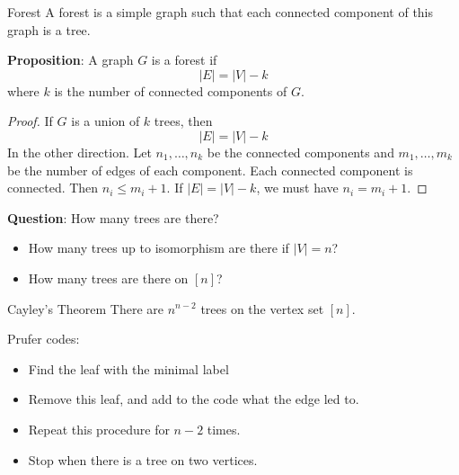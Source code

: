 \documentclass{report}
\begin{document}
\begin{definition}{Forest}
    A forest is a simple graph such that each connected component of this graph is a tree.
\end{definition}

\textbf{Proposition}: A graph $G$ is a forest if 
    \begin{equation*}
        \lvert E \rvert = \lvert V \rvert - k
    \end{equation*}
where $k$ is the number of connected components of $G$.
    \begin{proof}
        If $G$ is a union of $k$ trees, then
            \begin{equation*}
                \lvert E \rvert = \lvert V \rvert - k
            \end{equation*}
        In the other direction. Let $n_{1}, \ldots, n_{k}$ be the connected components and $m_{1}, \ldots, m_{k}$ be the number of edges of each component. Each connected component is connected. Then $n_{i} \leq m_{i} + 1$. If $\lvert E \rvert = \lvert V \rvert - k$, we must have $n_{i} = m_{i} + 1$.
    \end{proof}

\textbf{Question}: How many trees are there?
    \begin{itemize}
        \item How many trees up to isomorphism are there if $\lvert V \rvert = n$?

        \item How many trees are there on $[n]$?
    \end{itemize}

\begin{theorem}{Cayley's Theorem}
    There are $n^{n - 2}$ trees on the vertex set $[n]$.
\end{theorem}

Prufer codes:
    \begin{itemize}
        \item Find the leaf with the minimal label

        \item Remove this leaf, and add to the code what the edge led to.

        \item Repeat this procedure for $n - 2$ times. 

        \item Stop when there is a tree on two vertices.
    \end{itemize}
\end{document}
